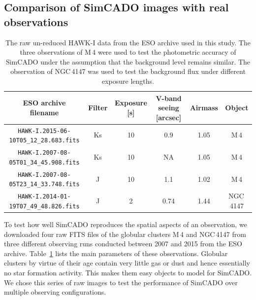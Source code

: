 \subsection{Comparison of SimCADO images with real observations}
\label{subsec:HAWKI_comparison}

\begin{table}

    \centering
    \caption{The raw un-reduced HAWK-I data from the ESO archive used in this study. The three observations of M\,4 were used to test the photometric accuracy of SimCADO under the assumption that the background level remains similar. The observation of NGC\,4147 was used to test the background flux under different exposure lengths.}
    \label{tab:HAWKI_raw}
    \begin{tabular}{c c c c c c }
        \hline\hline
        ESO archive filename                        & Filter & Exposure [s] & V-band seeing [arcsec]    &  Airmass  & Object  \\
        \hline
        \verb+HAWK-I.2015-06-10T05_12_28.683.fits+   & Ks     &  10          &  0.9                      &  1.05     & M\,4    \\
        \verb+HAWK-I.2007-08-05T01_34_45.908.fits+   & Ks     &  10          &  NA                       &  1.05     & M\,4    \\
        \verb+HAWK-I.2007-08-05T23_14_33.748.fits+   & J      &  10          &  1.1                      &  1.02     & M\,4    \\
        \hline
        \verb+HAWK-I.2014-01-19T07_49_48.826.fits+   & J      &  2           &  0.74                     &  1.44     & NGC\,4147    \\
        \hline
    \end{tabular}
    
\end{table}


To test how well SimCADO reproduces the spatial aspects of an observation, we downloaded four raw FITS files of the globular clusters M\,4 and NGC\,4147 from three different observing runs conducted between 2007 and 2015 from the ESO archive. Table~\ref{tab:HAWKI_raw} lists the main parameters of these observations. Globular clusters by virtue of their age contain very little gas or dust and hence essentially no star formation activity. This makes them easy objects to model for SimCADO. We chose this series of raw images to test the performance of SimCADO over multiple observing configurations. 

